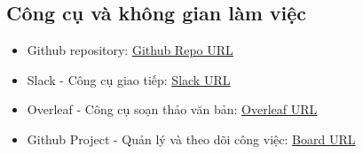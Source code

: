 \documentclass[a4paper, 12pt]{article}
\begin{document}
\subsection{Công cụ và không gian làm việc}
\begin{itemize}
    \item Github repository:
    \href{https://github.com/UIT-24730009/SnakeGame}{Github Repo URL}
    \item Slack - Công cụ giao tiếp:
    \href{https://app.slack.com/client/T07Q56DLLUX/C07U74U2XGF}{Slack URL}
    \item Overleaf - Công cụ soạn thảo văn bản:
    \href{https://www.overleaf.com/project/67271c85e33c6e0dfe041c9d}{Overleaf URL}
    \item Github Project - Quản lý và theo dõi công việc:
    \href{https://github.com/users/UIT-24730009/projects/1/views/1}{Board URL}
\end{itemize}
\end{document}
